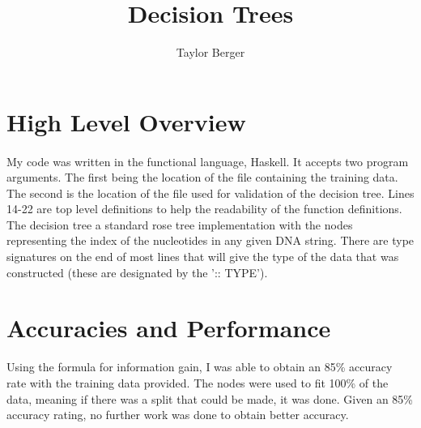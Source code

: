 \documentclass[12pt]{article}
\begin{document}
\title{Decision Trees}
\author{Taylor Berger}
\date{}
\maketitle

\section{High Level Overview}
\paragraph{}My code was written in the functional language, Haskell. It accepts two program arguments. The first being the location of the file containing the training data. The second is the location of the file used for validation of the decision tree. Lines 14-22 are top level definitions to help the readability of the function definitions. The decision tree a standard rose tree implementation with the nodes representing the index of the nucleotides in any given DNA string. There are type signatures on the end of most lines that will give the type of the data that was constructed (these are designated by the ':: TYPE'). 

\paragraph{}

\section{Accuracies and Performance}
Using the formula for information gain, I was able to obtain an 85\% accuracy rate with the training data provided. The nodes were used to fit 100\% of the data, meaning if there was a split that could be made, it was done. Given an 85\% accuracy rating, no further work was done to obtain better accuracy.
\end{document}
